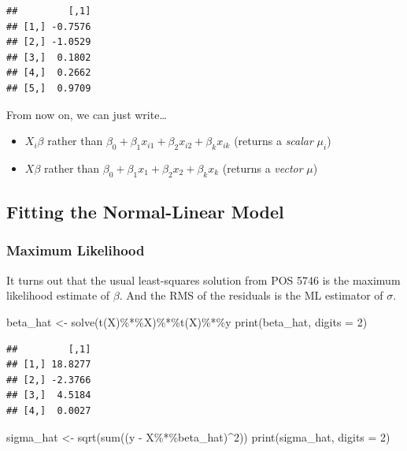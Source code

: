 \documentclass[
]{book}
\newenvironment{Shaded}{\begin{snugshade}}{\end{snugshade}}
\newcommand{\AttributeTok}[1]{\textcolor[rgb]{0.77,0.63,0.00}{#1}}
\newcommand{\DecValTok}[1]{\textcolor[rgb]{0.00,0.00,0.81}{#1}}
\newcommand{\FunctionTok}[1]{\textcolor[rgb]{0.00,0.00,0.00}{#1}}
\newcommand{\NormalTok}[1]{#1}
\newcommand{\OtherTok}[1]{\textcolor[rgb]{0.56,0.35,0.01}{#1}}
\newcommand{\SpecialCharTok}[1]{\textcolor[rgb]{0.00,0.00,0.00}{#1}}
\providecommand{\tightlist}{%
  \setlength{\itemsep}{0pt}\setlength{\parskip}{0pt}}
\begin{document}
\begin{verbatim}
##         [,1]
## [1,] -0.7576
## [2,] -1.0529
## [3,]  0.1802
## [4,]  0.2662
## [5,]  0.9709
\end{verbatim}

From now on, we can just write\ldots{}

\begin{itemize}
\tightlist
\item
  \(X_i\beta\) rather than
  \(\beta_0 + \beta_1 x_{i1} + \beta_2 x_{i2} + \beta_k x_{ik}\)
  (returns a \emph{scalar} \(\mu_i\))
\item
  \(X\beta\) rather than
  \(\beta_0 + \beta_1 x_{1} + \beta_2 x_{2} + \beta_k x_{k}\) (returns a
  \emph{vector} \(\mu\))
\end{itemize}

\hypertarget{fitting-the-normal-linear-model}{%
\subsection{Fitting the Normal-Linear
Model}\label{fitting-the-normal-linear-model}}

\hypertarget{maximum-likelihood-1}{%
\subsubsection{Maximum Likelihood}\label{maximum-likelihood-1}}

It turns out that the usual least-squares solution from POS 5746 is the
maximum likelihood estimate of \(\beta\). And the RMS of the residuals
is the ML estimator of \(\sigma\).

\begin{Shaded}
\begin{Highlighting}[]
\NormalTok{beta\_hat }\OtherTok{\textless{}{-}} \FunctionTok{solve}\NormalTok{(}\FunctionTok{t}\NormalTok{(X)}\SpecialCharTok{\%*\%}\NormalTok{X)}\SpecialCharTok{\%*\%}\FunctionTok{t}\NormalTok{(X)}\SpecialCharTok{\%*\%}\NormalTok{y}
\FunctionTok{print}\NormalTok{(beta\_hat, }\AttributeTok{digits =} \DecValTok{2}\NormalTok{)}
\end{Highlighting}
\end{Shaded}

\begin{verbatim}
##         [,1]
## [1,] 18.8277
## [2,] -2.3766
## [3,]  4.5184
## [4,]  0.0027
\end{verbatim}

\begin{Shaded}
\begin{Highlighting}[]
\NormalTok{sigma\_hat }\OtherTok{\textless{}{-}} \FunctionTok{sqrt}\NormalTok{(}\FunctionTok{sum}\NormalTok{((y }\SpecialCharTok{{-}}\NormalTok{ X}\SpecialCharTok{\%*\%}\NormalTok{beta\_hat)}\SpecialCharTok{\^{}}\DecValTok{2}\NormalTok{))}
\FunctionTok{print}\NormalTok{(sigma\_hat, }\AttributeTok{digits =} \DecValTok{2}\NormalTok{)}
\end{Highlighting}
\end{Shaded}
\end{document}
